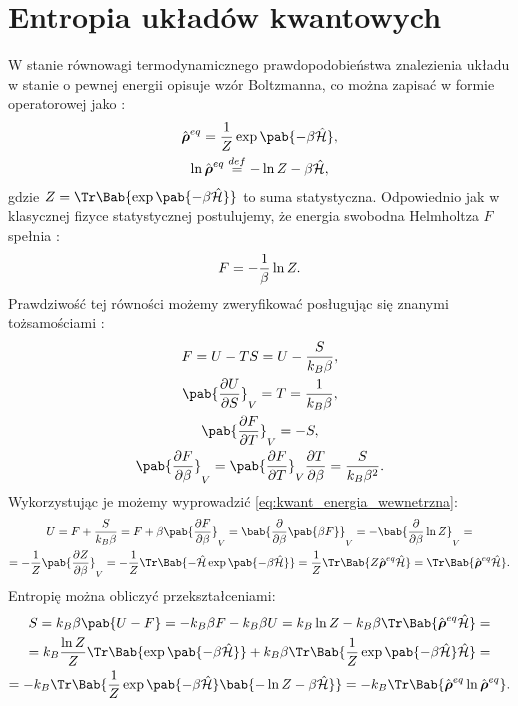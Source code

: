 
\section{Entropia układów kwantowych}\label{sec:entropia_kwantowa}
W stanie równowagi termodynamicznego prawdopodobieństwa znalezienia układu w stanie o pewnej energii opisuje wzór Boltzmanna, co można zapisać w formie operatorowej jako \cite{b:huang_podstawy_fizyki_statystycznej}:
\begin{gather}
	\vu{\rho}^{eq} = \inv{Z} \exp\pab{-\beta\ham}, \\
	\ln\vu{\rho}^{eq} \overset{def}{=} - \ln Z - \beta\ham,
\end{gather}
gdzie \(Z = \Tr\Bab{\exp\pab{-\beta\ham}}\) to suma statystyczna. Odpowiednio jak w klasycznej fizyce statystycznej postulujemy, że energia swobodna Helmholtza \(F\) spełnia \cite{b:huang_mechanika_statystyczna}:
\begin{equation*}
	F = - \frac{1}{\beta} \ln Z.
\end{equation*}
Prawdziwość tej równości możemy zweryfikować posługując się znanymi tożsamościami \cite{b:pudlik_termodynamika, lobejko}:
\begin{gather*}
	F = U - TS = U - \frac{S}{k_B \beta}, \\
	\pab{\pdv{U}{S}}_V = T = \inv{k_B \beta}, \\
	\pab{\pdv{F}{T}}_V = -S, \\
	\pab{\pdv{F}{\beta}}_V = \pab{\pdv{F}{T}}_V \pdv{T}{\beta} = \frac{S}{k_B \beta^2}.
\end{gather*}
Wykorzystując je możemy wyprowadzić \eqref{eq:kwant_energia_wewnetrzna}:
\begin{multline*}
	U = F + \frac{S}{k_B \beta} =
	F + \beta \pab{\pdv{F}{\beta}}_V =
	\bab{\pdv{}{\beta}\pab{\beta F}}_V =
	- \bab{\pdv{}{\beta}\ln Z}_V = \\ =
	- \inv{Z} \pab{\pdv{Z}{\beta}}_V =
	- \inv{Z} \Tr\Bab{- \ham \exp\pab{-\beta\ham}} =
	\inv{Z} \Tr\Bab{Z \vu{\rho}^{eq} \ham} =
	\Tr\Bab{\vu{\rho}^{eq} \ham}.
\end{multline*}
Entropię można obliczyć przekształceniami:
\begin{multline*}
	S =
	k_B \beta \pab{U - F} =
	- k_B \beta F - k_B \beta U =
	k_B \ln Z - k_B \beta \Tr\Bab{\vu{\rho}^{eq} \ham} = \\ =
	k_B \frac{\ln Z}{Z} \Tr\Bab{\exp\pab{-\beta\ham}} + k_B \beta\Tr\Bab{\inv{Z} \exp\pab{-\beta\ham} \ham} = \\ =
	- k_B \Tr\Bab{\inv{Z}\exp\pab{-\beta\ham} \bab{- \ln Z - \beta\ham}} =
	- k_B \Tr\Bab{\vu{\rho}^{eq} \ln \vu{\rho}^{eq}}.
\end{multline*}